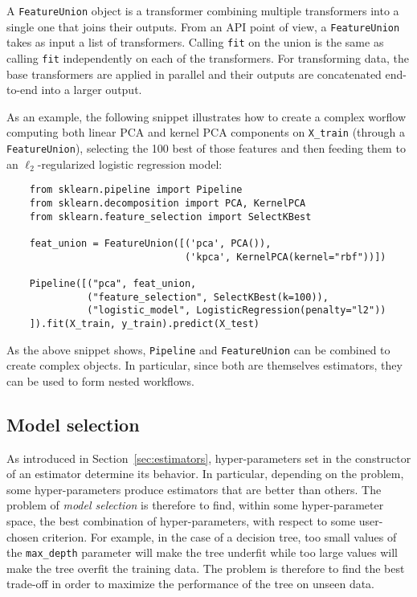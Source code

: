 \documentclass{llncs}
\begin{document}
A \texttt{FeatureUnion} object is a transformer combining multiple transformers
into a single one that joins their outputs. From an API point of view, a
\texttt{FeatureUnion} takes as input a list of transformers. Calling
\texttt{fit} on the union is the same as calling \texttt{fit} independently on
each of the transformers. For transforming data, the base transformers are
applied in parallel and their outputs are concatenated end-to-end into a larger
output.

As an example, the following snippet illustrates how to create a complex worflow
computing both linear PCA and kernel PCA components on \texttt{X\_train}
(through a \texttt{FeatureUnion}), selecting the 100 best of those features and
then feeding them to an $\ell_2$-regularized logistic regression model:
\begin{verbatim}
    from sklearn.pipeline import Pipeline
    from sklearn.decomposition import PCA, KernelPCA
    from sklearn.feature_selection import SelectKBest

    feat_union = FeatureUnion([('pca', PCA()),
                               ('kpca', KernelPCA(kernel="rbf"))])

    Pipeline([("pca", feat_union,
              ("feature_selection", SelectKBest(k=100)),
              ("logistic_model", LogisticRegression(penalty="l2"))
    ]).fit(X_train, y_train).predict(X_test)
\end{verbatim}

As the above snippet shows, \texttt{Pipeline} and \texttt{FeatureUnion} can be
combined to create complex objects. In particular, since both are themselves
estimators, they can be used to form nested workflows.

\subsection{Model selection}

As introduced in Section~\ref{sec:estimators}, hyper-parameters set in the
constructor of an estimator determine its behavior. In particular, depending on
the problem, some hyper-parameters produce estimators that are better than
others. The problem of \textit{model selection} is therefore to find, within
some hyper-parameter space, the best combination of hyper-parameters, with
respect to some user-chosen criterion. For example, in the case of a decision
tree, too small values of the \texttt{max\_depth} parameter will make the tree
underfit while too large values will make the tree overfit the training data.
The problem is therefore to find the best trade-off in order to maximize
the performance of the tree on unseen data.
\end{document}
